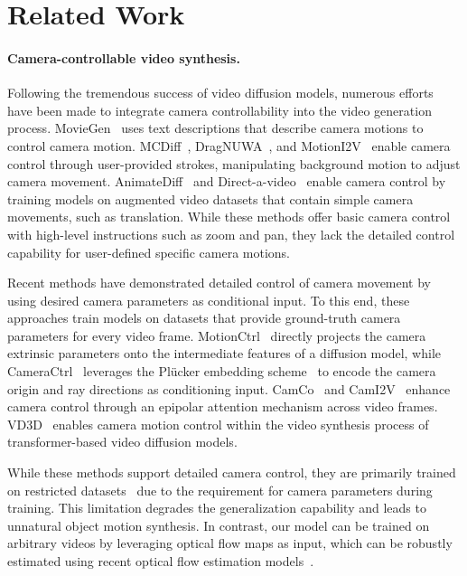 \section{Related Work}
\label{sec:related}

\paragraph{Camera-controllable video synthesis.}
Following the tremendous success of video diffusion models, numerous efforts have been made to integrate camera controllability into the video generation process.
MovieGen~\cite{polyak2024movie} uses text descriptions that describe camera motions to control camera motion.
MCDiff~\cite{chen2023motion}, DragNUWA~\cite{yin2023dragnuwa}, and MotionI2V~\cite{shi2024motion} enable camera control through user-provided strokes, manipulating background motion to adjust camera movement.
AnimateDiff~\cite{guo2023animatediff} and Direct-a-video~\cite{yang2024direct} enable camera control by training models on augmented video datasets that contain simple camera movements, such as translation.
While these methods offer basic camera control with high-level instructions such as zoom and pan, they lack the detailed control capability for user-defined specific camera motions. 


Recent methods have demonstrated detailed control of camera movement by using desired camera parameters as conditional input.
To this end, these approaches train models on datasets that provide ground-truth camera parameters for every video frame.
MotionCtrl~\cite{wang2024motionctrl} directly projects the camera extrinsic parameters onto the intermediate features of a diffusion model, while CameraCtrl~\cite{he2024cameractrl} leverages the Pl\"{u}cker embedding scheme~\cite{sitzmann2021light} to encode the camera origin and ray directions as conditioning input.
CamCo~\cite{xu2024camco} and CamI2V~\cite{zheng2024cami2v} enhance camera control through an epipolar attention mechanism across video frames.
VD3D~\cite{bahmani2024vd3d} enables camera motion control within the video synthesis process of transformer-based video diffusion models.

While these methods support detailed camera control, they are primarily trained on restricted datasets~\cite{zhou2018stereo} due to the requirement for camera parameters during training.
This limitation degrades the generalization capability and leads to unnatural object motion synthesis.
In contrast, our model can be trained on arbitrary videos by leveraging optical flow maps as input, which can be robustly estimated using recent optical flow estimation models~\cite{teed2020raft}.


